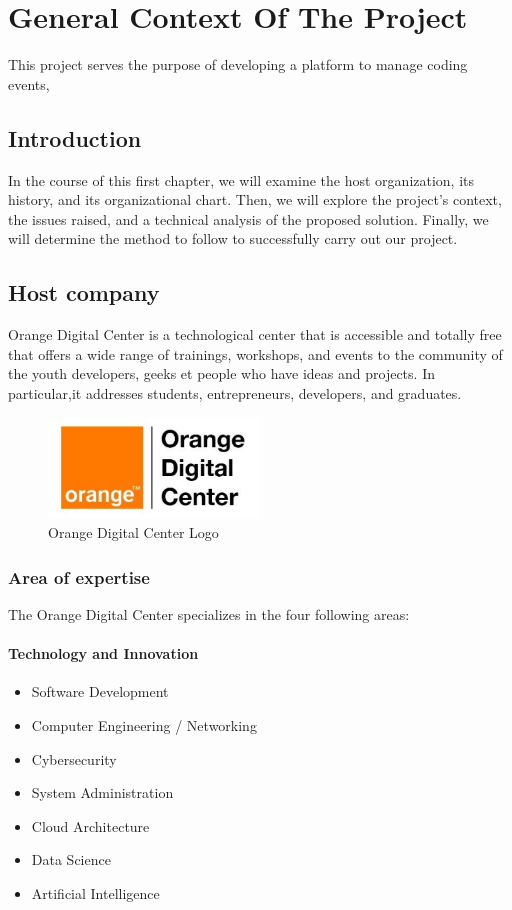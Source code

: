 \chapter{General Context Of The Project}
This project serves the purpose of developing a platform to manage coding
events,

\section{Introduction}
In the course of this first chapter,
we will examine the host organization,
its history, and its organizational chart.
Then, we will explore the project's context,
the issues raised, and a technical analysis of the proposed solution. Finally,
we will determine the method to follow to successfully carry out our project.


\section{Host company}
Orange Digital Center\cite{OrangeDigitalCenter} is a technological center that
is accessible and totally free that offers a wide range of trainings, workshops, and events to the community
of the youth developers, geeks et people who have ideas and projects. In particular,it addresses
students, entrepreneurs, developers, and graduates.

\begin{figure}[h]
      \centering
      \includegraphics[width=0.5\textwidth]{images/odc.png}
      \caption{Orange Digital Center Logo}
      \label{fig:Orange Digital Center Logo}
\end{figure}

\subsection{Area of expertise}
The Orange Digital Center specializes in the four following areas:
\subsubsection{Technology and Innovation}
\begin{itemize}
      \item Software Development
      \item Computer Engineering / Networking
      \item Cybersecurity
      \item System Administration
      \item Cloud Architecture
      \item Data Science
      \item Artificial Intelligence
\end{itemize}

